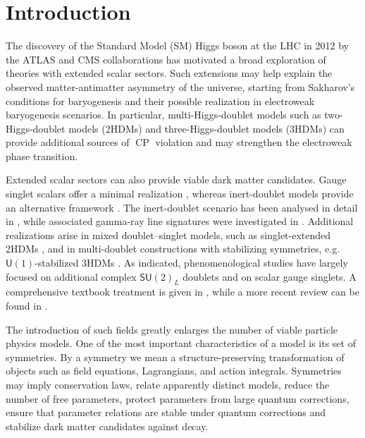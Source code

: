 \documentclass[a4paper,hidelinks, 12pt]{article}
\numberwithin{equation}{section}
\theoremstyle{plain}
\newcommand{\Lg}{\mathsf}
\newcommand{\on}{\operatorname}
\begin{document}
\setcounter{footnote}{0}

\tableofcontents

\section{Introduction}
\label{sect:intro}
The discovery of the Standard Model (SM) Higgs boson at the LHC in 2012 by the
ATLAS \cite{ATLAS:2012yve} and CMS \cite{CMS:2012qbp} collaborations has
motivated a broad exploration of theories with extended scalar sectors. Such extensions may help explain the observed matter-antimatter asymmetry of
the universe, starting from Sakharov's conditions for baryogenesis
\cite{Sakharov:1967dj} and their possible realization in electroweak
baryogenesis scenarios. In particular, multi-Higgs-doublet models such as two-Higgs-doublet models
(2HDMs) \cite{Turok:1990zg} and three-Higgs-doublet models (3HDMs)
\cite{Weinberg:1976hu} can provide additional sources of $\on{CP}$ violation
and may strengthen the electroweak phase transition.

 Extended scalar sectors can also provide viable dark matter candidates. Gauge
singlet scalars offer a minimal realization \cite{McDonald:1993ex}, whereas
inert-doublet models provide an alternative framework \cite{Barbieri_2006}.
The inert-doublet scenario has been analysed in detail in \cite{Honorez_2007},
while associated gamma-ray line signatures were investigated in
\cite{Gustafsson_2007}.
 Additional
realizations arise in mixed doublet--singlet models, such as singlet-extended
2HDMs \cite{Drozd:2014yla}, and in multi-doublet constructions with
stabilizing symmetries, e.g.\ $\Lg{U}(1)$-stabilized 3HDMs \cite{Kun_inas_2024}.
As indicated, phenomenological studies have largely focused on additional
complex $\Lg{SU}(2)_L$ doublets \cite{ROSS1975135} and on scalar gauge
singlets. A comprehensive textbook treatment is given in \cite{Gunion:1989we},
while a more recent review can be found in \cite{Ivanov_2017}.


The introduction of such fields greatly enlarges the number of viable
particle physics models. One of the most important characteristics of a model
is its set of symmetries. By a symmetry we mean a structure-preserving
transformation of objects such as field equations, Lagrangians, and action
integrals.
Symmetries may imply conservation laws, relate apparently distinct models, reduce the number of free parameters, protect parameters from large quantum corrections, ensure that parameter relations are stable under quantum corrections and stabilize 
dark matter candidates against decay.    
\end{document}
